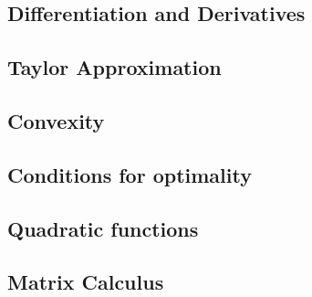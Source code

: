 \subsection{Differentiation and Derivatives}


\subsection{Taylor Approximation}


\subsection{Convexity}


\subsection{Conditions for optimality}


\subsection{Quadratic functions}


\subsection{Matrix Calculus}

